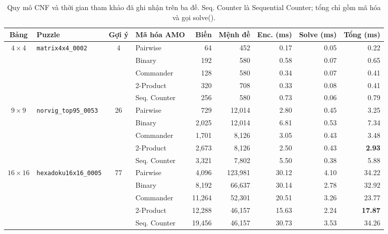 \documentclass[a4paper,fleqn,nologo]{cas-sc}
\begin{document}
\begin{table}[pos=!htbp]
\centering
\footnotesize
\caption{Quy mô CNF và thời gian tham khảo đã ghi nhận trên ba đề. Seq. Counter là Sequential Counter; tổng chỉ gồm mã hóa và gọi solve().}
\label{tab:case_size}
\begin{tabular}{@{}c l c l r r r r r@{}}
\toprule
\textbf{Bảng} & \textbf{Puzzle} & \textbf{Gợi ý} & \textbf{Mã hóa AMO} & \textbf{Biến} & \textbf{Mệnh đề} & \textbf{Enc. (ms)} & \textbf{Solve (ms)} & \textbf{Tổng (ms)} \\
\midrule
\multirow{5}{*}{$4\times4$} & \multirow{5}{*}{\texttt{matrix4x4\_0002}} & \multirow{5}{*}{4} & Pairwise & 64 & 452 & 0.17 & 0.05 & 0.22 \\
 & & & Binary & 192 & 580 & 0.58 & 0.07 & 0.65 \\
 & & & Commander & 128 & 580 & 0.34 & 0.07 & 0.41 \\
 & & & 2-Product & 320 & 708 & 0.33 & 0.08 & 0.41 \\
 & & & Seq. Counter & 256 & 580 & 0.73 & 0.06 & 0.79 \\
\midrule
\multirow{5}{*}{$9\times9$} & \multirow{5}{*}{\texttt{norvig\_top95\_0053}} & \multirow{5}{*}{26} & Pairwise & 729 & 12,014 & 2.80 & 0.45 & 3.25 \\
 & & & Binary & 2,025 & 12,014 & 6.81 & 0.53 & 7.34 \\
 & & & Commander & 1,701 & 8,126 & 3.05 & 0.43 & 3.48 \\
 & & & 2-Product & 2,673 & 8,126 & 2.50 & 0.43 & \textbf{2.93} \\
 & & & Seq. Counter & 3,321 & 7,802 & 5.50 & 0.38 & 5.88 \\
\midrule
\multirow{5}{*}{$16\times16$} & \multirow{5}{*}{\texttt{hexadoku16x16\_0005}} & \multirow{5}{*}{77} & Pairwise & 4,096 & 123,981 & 30.12 & 4.10 & 34.22 \\
 & & & Binary & 8,192 & 66,637 & 30.14 & 2.78 & 32.92 \\
 & & & Commander & 11,264 & 52,301 & 20.51 & 3.26 & 23.77 \\
 & & & 2-Product & 12,288 & 46,157 & 15.63 & 2.24 & \textbf{17.87} \\
 & & & Seq. Counter & 19,456 & 46,157 & 30.73 & 3.53 & 34.26 \\
\bottomrule
\end{tabular}
\end{table}
\end{document}
